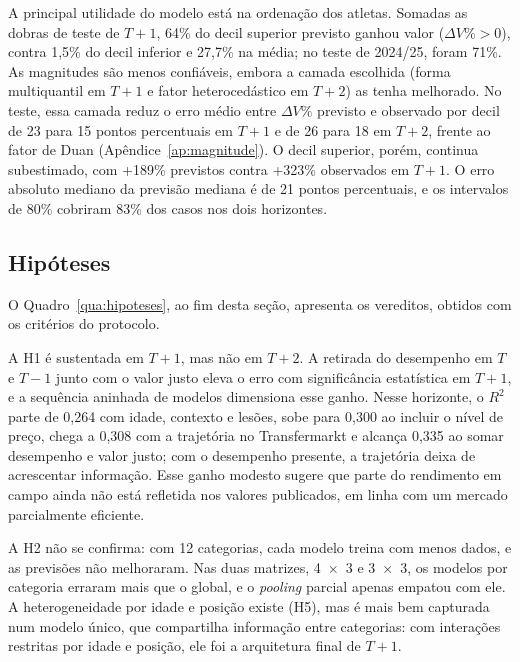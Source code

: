 \documentclass[article, 12pt, oneside, a4paper, english, brazil, section=TITLE]{abntex2}
\begin{document}
A principal utilidade do modelo está na ordenação dos atletas.
Somadas as dobras de teste de $T+1$, 64\% do decil superior previsto ganhou valor ($\Delta V\% > 0$), contra 1,5\% do decil inferior e 27,7\% na média; no teste de 2024/25, foram 71\%.
As magnitudes são menos confiáveis, embora a camada escolhida (forma multiquantil em $T+1$ e fator heterocedástico em $T+2$) as tenha melhorado.
No teste, essa camada reduz o erro médio entre $\Delta V\%$ previsto e observado por decil de 23 para 15 pontos percentuais em $T+1$ e de 26 para 18 em $T+2$, frente ao fator de Duan (Apêndice~\ref{ap:magnitude}).
O decil superior, porém, continua subestimado, com +189\% previstos contra +323\% observados em $T+1$.
O erro absoluto mediano da previsão mediana é de 21 pontos percentuais, e os intervalos de 80\% cobriram 83\% dos casos nos dois horizontes.

\subsection{Hipóteses}

O Quadro~\ref{qua:hipoteses}, ao fim desta seção, apresenta os vereditos, obtidos com os critérios do protocolo.

A H1 é sustentada em $T+1$, mas não em $T+2$.
A retirada do desempenho em $T$ e $T-1$ junto com o valor justo eleva o erro com significância estatística em $T+1$, e a sequência aninhada de modelos dimensiona esse ganho.
Nesse horizonte, o $R^2$ parte de 0,264 com idade, contexto e lesões, sobe para 0,300 ao incluir o nível de preço, chega a 0,308 com a trajetória no Transfermarkt e alcança 0,335 ao somar desempenho e valor justo; com o desempenho presente, a trajetória deixa de acrescentar informação.
Esse ganho modesto sugere que parte do rendimento em campo ainda não está refletida nos valores publicados, em linha com um mercado parcialmente eficiente.

A H2 não se confirma: com 12 categorias, cada modelo treina com menos dados, e as previsões não melhoraram.
Nas duas matrizes, 4~×~3 e 3~×~3, os modelos por categoria erraram mais que o global, e o \textit{pooling} parcial apenas empatou com ele.
A heterogeneidade por idade e posição existe (H5), mas é mais bem capturada num modelo único, que compartilha informação entre categorias: com interações restritas por idade e posição, ele foi a arquitetura final de $T+1$.
\end{document}
